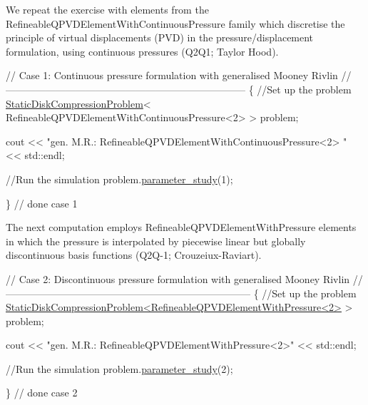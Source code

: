 We repeat the exercise with elements from the {\ttfamily Refineable\+Q\+P\+V\+D\+Element\+With\+Continuous\+Pressure} family which discretise the principle of virtual displacements (P\+VD) in the pressure/displacement formulation, using continuous pressures (Q2\+Q1; Taylor Hood).


\begin{DoxyCodeInclude}
 
 
 \textcolor{comment}{// Case 1: Continuous pressure formulation with generalised Mooney Rivlin}
 \textcolor{comment}{//------------------------------------------------------------------------}
 \{
  \textcolor{comment}{//Set up the problem}
  \hyperlink{classStaticDiskCompressionProblem}{StaticDiskCompressionProblem}<
   RefineableQPVDElementWithContinuousPressure<2> > problem;
  
  cout << \textcolor{stringliteral}{"gen. M.R.: RefineableQPVDElementWithContinuousPressure<2> "} 
       << std::endl;
  
  \textcolor{comment}{//Run the simulation}
  problem.\hyperlink{classStaticDiskCompressionProblem_ac64db4786efde78e70b1110422331b02}{parameter\_study}(1);

 \}  \textcolor{comment}{// done case 1}

\end{DoxyCodeInclude}


The next computation employs {\ttfamily Refineable\+Q\+P\+V\+D\+Element\+With\+Pressure} elements in which the pressure is interpolated by piecewise linear but globally discontinuous basis functions (Q2\+Q-\/1; Crouzeiux-\/\+Raviart).


\begin{DoxyCodeInclude}
 
 
 
 \textcolor{comment}{// Case 2: Discontinuous pressure formulation with generalised Mooney Rivlin}
 \textcolor{comment}{//--------------------------------------------------------------------------}
 \{
  \textcolor{comment}{//Set up the problem}
  \hyperlink{classStaticDiskCompressionProblem}{StaticDiskCompressionProblem<RefineableQPVDElementWithPressure<2>}
       > 
   problem;
  
  cout << \textcolor{stringliteral}{"gen. M.R.: RefineableQPVDElementWithPressure<2>"} << std::endl;
  
  \textcolor{comment}{//Run the simulation}
  problem.\hyperlink{classStaticDiskCompressionProblem_ac64db4786efde78e70b1110422331b02}{parameter\_study}(2);
  
 \}  \textcolor{comment}{// done case 2}

\end{DoxyCodeInclude}


